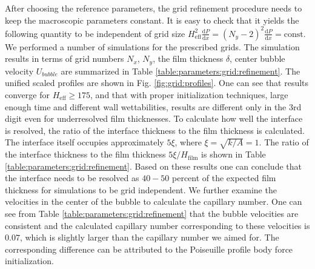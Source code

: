 \documentclass[preprint,12pt]{elsarticle}
\begin{document}
After choosing the reference parameters, the grid refinement procedure
needs to keep the macroscopic parameters constant.  It is easy to check
that it yields the following quantity to
be independent of grid size
$H_{\mathrm{eff}}^2\frac{\mathrm{d}P}{\mathrm{d}x}=(N_y-2)^2\frac{\mathrm{d}P}{\mathrm{d}
x } = \mathrm{const}$. We performed a number of simulations for the prescribed grids. The
simulation results in terms of grid numbers $N_x$, $N_y$, the film thickness $\delta$, center bubble
velocity $U_{bubble}$ are summarized in Table \ref{table:parameters:grid:refinement}.
The unified scaled profiles are shown in Fig. \ref{fig:grid:profiles}. One can
see that results converge for $H_{\mathrm{eff}}\geq 175$, and that with proper
initialization techniques, large enough time and different wall
wettabilities, results are different only in the 3rd digit even for
underresolved film thicknesses. To calculate how well the interface is
resolved, the ratio of the interface thickness to the film thickness is calculated. The
interface itself occupies approximately $5 \xi$, where
$\xi=\sqrt{k/A}=1$. The ratio of the interface thickness to the film thickness
$5\xi/H_{\mathrm{film}}$
 is shown in Table \ref{table:parameters:grid:refinement}. Based on these results one can conclude that
 the interface needs to be resolved as $40-50$ percent of the
expected film thickness for simulations to be grid independent. We further examine the
velocities in the center of the bubble to calculate the capillary number. One can see from Table
\ref{table:parameters:grid:refinement} that the bubble velocities are consistent and the
calculated capillary number corresponding to these velocities is $0.07$, which is slightly
larger than the capillary number we aimed for. The corresponding difference can be
attributed to the Poiseuille profile body force initialization.%
\end{document}
